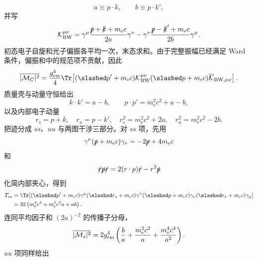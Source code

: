 \begin{derivation}
\begin{equation*}
 a\equiv p\cdot k,\qquad b\equiv p\cdot k',
\end{equation*}
并写
\begin{equation*}
 \mathcal K_{\rm BW}^{\mu\nu}
 =\gamma^\mu\frac{\slashed p+\slashed k+m_{\mathrm e} c}{2a}\gamma^\nu
 -\gamma^\nu\frac{\slashed p-\slashed k'+m_{\mathrm e} c}{2b}\gamma^\mu .
\end{equation*}
初态电子自旋和光子偏振各平均一次，末态求和。由于完整振幅已经满足 Ward 条件，偏振和中的规范项不贡献，因此
\begin{equation*}
 \overline{|\mathcal M_C|^2}
 =\frac{g_{\rm em}^4}{4}
 \Tr\!\left[(\slashed p'+m_{\mathrm e} c)\mathcal K_{\rm BW}^{\mu\nu}
 (\slashed p+m_{\mathrm e} c)\overline{\mathcal K}_{{\rm BW},\mu\nu}\right].
\end{equation*}
质量壳与动量守恒给出
\begin{equation*}
 k\cdot k'=a-b,\qquad
 p\cdot p'=m_{\mathrm e}^2c^2+a-b,
\end{equation*}
以及内部电子动量
\begin{equation*}
 r_s=p+k,\quad r_u=p-k',\quad
 r_s^2=m_{\mathrm e}^2c^2+2a,\quad r_u^2=m_{\mathrm e}^2c^2-2b.
\end{equation*}
把迹分成 $ss$、$uu$ 与两图干涉三部分。对 $ss$ 项，先用
\begin{equation*}
 \gamma^\nu(\slashed p+m_{\mathrm e} c)\gamma_\nu=-2\slashed p+4m_{\mathrm e} c
\end{equation*}
和
\begin{equation*}
 \slashed r\slashed p\slashed r=2(r\cdot p)\slashed r-r^2\slashed p
\end{equation*}
化简内部夹心，得到
\begin{align*}
 T_{ss}
 &=\Tr\!\left[(\slashed p'+m_{\mathrm e} c)\gamma^\mu(\slashed r_s+m_{\mathrm e} c)
 \gamma^\nu(\slashed p+m_{\mathrm e} c)\gamma_\nu(\slashed r_s+m_{\mathrm e} c)\gamma_\mu\right]\\
 &=32\left(m_{\mathrm e}^4c^4+m_{\mathrm e}^2c^2a+ab\right).
\end{align*}
连同平均因子和 $(2a)^{-2}$ 的传播子分母，
\begin{equation*}
 \overline{|\mathcal M_s|^2}
 =2g_{\rm em}^4\left(\frac ba+\frac{m_{\mathrm e}^2c^2}{a}+\frac{m_{\mathrm e}^4c^4}{a^2}\right).
\end{equation*}
$uu$ 项同样给出
\begin{equation*}

\end{equation*}
\end{derivation}
